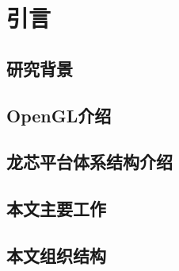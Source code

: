 

\chapter{引言}
\label{cha:intro}
  
\section{研究背景}


\section{OpenGL介绍}

\section{龙芯平台体系结构介绍}

\section{本文主要工作}

\section{本文组织结构}
